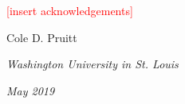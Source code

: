 \noindent \textcolor{red}{[insert acknowledgements]}
\vspace{20pt}

\begin{flushright}
  Cole D. Pruitt
\end{flushright}

\textit{Washington University in St. Louis}

\textit{May 2019}

\clearpage
